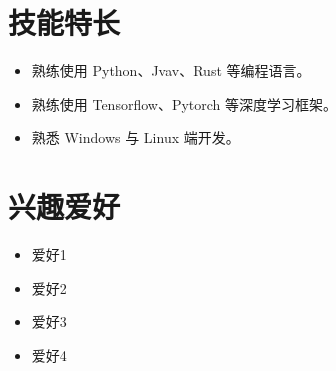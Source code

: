 \documentclass[11pt]{article} %
\newlength{\iconwidth}      %
\begin{document}
    \begin{minipage}[t]{0.6\textwidth} %
        \section[技能特长]{\makebox[\iconwidth][c]{\color{primary_color}{\faWrench}}\quad 技能特长}
        \begin{itemize}
        \setlength{\itemsep}{0.5em} %
            \item 熟练使用 Python、Jvav、Rust 等编程语言。 %
            \item 熟练使用 Tensorflow、Pytorch 等深度学习框架。
            \item 熟悉 Windows 与 Linux 端开发。
        \end{itemize}
    \end{minipage}%
    \hfill %
    \begin{minipage}[t]{0.35\textwidth} %
        \section[兴趣爱好]{\makebox[\iconwidth][c]{\color{primary_color}{\faStar}}\quad 兴趣爱好}
        \begin{itemize}
        \setlength{\itemsep}{0.5em} %
            \item 爱好1 %
            \item 爱好2
            \item 爱好3
            \item 爱好4
        \end{itemize}
    \end{minipage}

\end{document}
